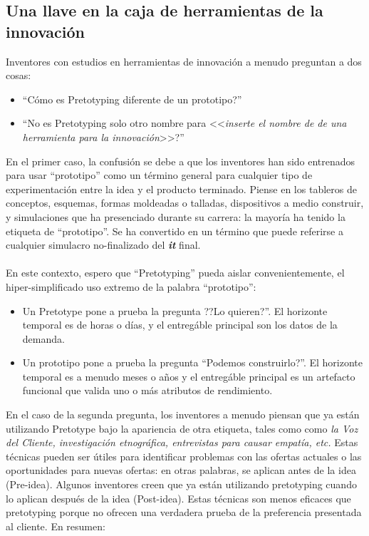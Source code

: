 \documentclass{article}
\begin{document}
\subsection{Una llave en la caja de herramientas de la innovaci\'on}

Inventores con estudios en herramientas de innovaci\'on a menudo preguntan a dos cosas:

\begin{itemize}

\item ``C\'omo es  Pretotyping diferente de un prototipo?''
\item ``No es Pretotyping solo otro nombre para <<{\textit{inserte el nombre de de una herramienta para la innovaci\'on}}>>?''

\end{itemize}

En el primer caso, la confusi\'on se debe a que los inventores han sido entrenados para usar ``prototipo'' como un t\'ermino general para cualquier tipo de experimentaci\'on entre la idea y el producto terminado. Piense en los tableros de conceptos, esquemas, formas moldeadas o talladas, dispositivos a medio construir, y simulaciones que ha presenciado durante su carrera: la mayor\'ia ha tenido la etiqueta de ``prototipo''. Se ha convertido en un t\'ermino que puede referirse a cualquier simulacro no-finalizado del \textbf{\textit{it}} final.
\\ \\
En este contexto, espero que ``Pretotyping'' pueda aislar convenientemente,  el hiper-simplificado uso extremo de la palabra ``prototipo'':

\begin{itemize}

\item Un Pretotype pone a prueba la pregunta ??Lo quieren?''. El horizonte temporal es de horas o d\'ias, y el entreg\'able principal son los datos de la demanda.

\item Un prototipo pone a prueba la pregunta ``Podemos construirlo?''. El horizonte temporal es a menudo meses o a\~nos y el entreg\'able principal es un artefacto funcional que valida uno o m\'as atributos de rendimiento.

\end{itemize}

En el caso de la segunda pregunta, los inventores a menudo piensan que ya est\'an utilizando Pretotype bajo la apariencia de otra etiqueta, tales como como \textit{la Voz del Cliente, investigaci\'on etnogr\'afica, entrevistas para causar empat\'ia, etc.} Estas t\'ecnicas pueden ser \'utiles para identificar problemas con las ofertas actuales o las oportunidades para nuevas ofertas: en otras palabras, se aplican antes de la idea (Pre-idea). Algunos inventores creen que ya est\'an utilizando pretotyping cuando lo aplican despu\'es de la idea (Post-idea). Estas t\'ecnicas son menos eficaces que pretotyping porque no ofrecen una verdadera prueba de la preferencia presentada al cliente. En resumen:
\end{document}

